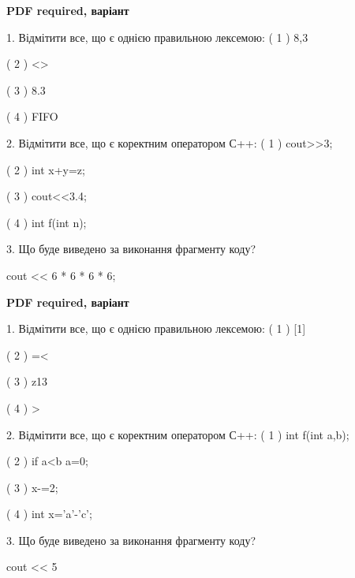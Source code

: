 \documentclass[11pt, ukrainian]{article}
\begin{document}
\begin{large}
\textbf{PDF required, варіант }\par

1. Відмітити все, що є однією правильною лексемою:
( 1 ) 8,3

( 2 ) <>

( 3 ) 8.3

( 4 ) FIFO


2. Відмітити все, що є коректним оператором С++:
( 1 ) cout>>3;

( 2 ) int x+y=z;

( 3 ) cout<<3.4;

( 4 ) int f(int n);


3. Що буде виведено за виконання фрагменту коду?

cout << 6 * 6 * 6 * 6;

\end{large}
\vspace{20mm}
\begin{large}
\textbf{PDF required, варіант }\par

1. Відмітити все, що є однією правильною лексемою:
( 1 ) [1]

( 2 ) =<

( 3 ) z13

( 4 ) >


2. Відмітити все, що є коректним оператором С++:
( 1 ) int f(int a,b);

( 2 ) if a<b a=0;

( 3 ) x-=2;

( 4 ) int x='a'-'c';


3. Що буде виведено за виконання фрагменту коду?

cout << 5 %

\end{large}
\newpage
\end{document}
